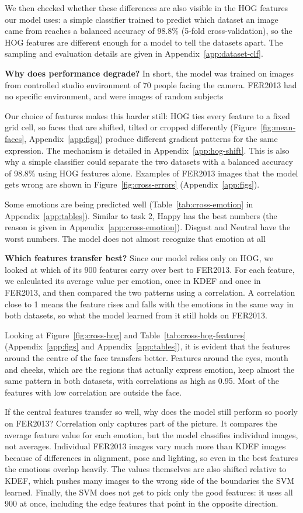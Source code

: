 We then checked whether these differences are also visible in the HOG features our model uses: a simple classifier trained to predict which dataset an image came from reaches a balanced accuracy of 98.8\% (5-fold cross-validation), so the HOG features are different enough for a model to tell the datasets apart. The sampling and evaluation details are given in Appendix~\ref{app:dataset-clf}.

\textbf{Why does performance degrade?} In short, the model was trained on images from controlled studio environment of 70 people facing the camera. FER2013 had no specific environment, and were images of random subjects

Our choice of features makes this harder still: HOG ties every feature to a fixed grid cell, so faces that are shifted, tilted or cropped differently (Figure~\ref{fig:mean-faces}, Appendix~\ref{app:figs}) produce different gradient patterns for the same expression. The mechanism is detailed in Appendix~\ref{app:hog-shift}. This is also why a simple classifier could separate the two datasets with a balanced accuracy of 98.8\% using HOG features alone. Examples of FER2013 images that the model gets wrong are shown in Figure~\ref{fig:cross-errors} (Appendix~\ref{app:figs}).

Some emotions are being predicted well (Table~\ref{tab:cross-emotion} in Appendix~\ref{app:tables}). Similar to task 2, Happy has the best numbers (the reason is given in Appendix~\ref{app:cross-emotion}). Disgust and Neutral have the worst numbers. The model does not almost recognize that emotion at all

\textbf{Which features transfer best?} Since our model relies only on HOG, we looked at which of its 900 features carry over best to FER2013. For each feature, we calculated its average value per emotion, once in KDEF and once in FER2013, and then compared the two patterns using a correlation. A correlation close to 1 means the feature rises and falls with the emotions in the same way in both datasets, so what the model learned from it still holds on FER2013.

Looking at Figure~\ref{fig:cross-hog} and Table~\ref{tab:cross-hog-features} (Appendix~\ref{app:figs} and Appendix~\ref{app:tables}), it is evident that the features around the centre of the face transfers better. Features around the eyes, mouth and cheeks, which are the regions that actually express emotion, keep almost the same pattern in both datasets, with correlations as high as 0.95. Most of the features with low correlation are outside the face.

If the central features transfer so well, why does the model still perform so poorly on FER2013? Correlation only captures part of the picture. It compares the average feature value for each emotion, but the model classifies individual images, not averages. Individual FER2013 images vary much more than KDEF images because of differences in alignment, pose and lighting, so even in the best features the emotions overlap heavily. The values themselves are also shifted relative to KDEF, which pushes many images to the wrong side of the boundaries the SVM learned. Finally, the SVM does not get to pick only the good features: it uses all 900 at once, including the edge features that point in the opposite direction.
